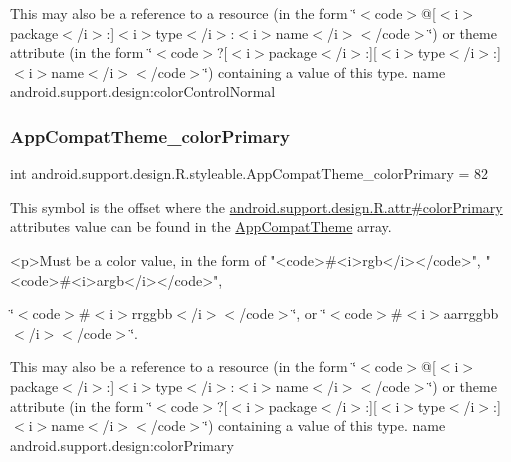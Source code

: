This may also be a reference to a resource (in the form \char`\"{}$<$code$>$@\mbox{[}$<$i$>$package$<$/i$>$\+:\mbox{]}$<$i$>$type$<$/i$>$\+:$<$i$>$name$<$/i$>$$<$/code$>$\char`\"{}) or theme attribute (in the form \char`\"{}$<$code$>$?\mbox{[}$<$i$>$package$<$/i$>$\+:\mbox{]}\mbox{[}$<$i$>$type$<$/i$>$\+:\mbox{]}$<$i$>$name$<$/i$>$$<$/code$>$\char`\"{}) containing a value of this type.  name android.\+support.\+design\+:color\+Control\+Normal \mbox{\label{classandroid_1_1support_1_1design_1_1R_1_1styleable_acffdce3af4b9cdfe390c502719236f7e}} 
\subsubsection{\texorpdfstring{App\+Compat\+Theme\+\_\+color\+Primary}{AppCompatTheme\_colorPrimary}}
{\footnotesize\ttfamily int android.\+support.\+design.\+R.\+styleable.\+App\+Compat\+Theme\+\_\+color\+Primary = 82\hspace{0.3cm}{\ttfamily [static]}}

This symbol is the offset where the \hyperlink{classandroid_1_1support_1_1design_1_1R_1_1attr_a541d0b27b3a34127103b8de1fcb27da8}{android.\+support.\+design.\+R.\+attr\#color\+Primary} attribute\textquotesingle{}s value can be found in the \hyperlink{classandroid_1_1support_1_1design_1_1R_1_1styleable_afb351dc8de20cbd4c89abe360373010c}{App\+Compat\+Theme} array.

\begin{DoxyVerb}      <p>Must be a color value, in the form of "<code>#<i>rgb</i></code>", "<code>#<i>argb</i></code>",
\end{DoxyVerb}
 \char`\"{}$<$code$>$\#$<$i$>$rrggbb$<$/i$>$$<$/code$>$\char`\"{}, or \char`\"{}$<$code$>$\#$<$i$>$aarrggbb$<$/i$>$$<$/code$>$\char`\"{}. 

This may also be a reference to a resource (in the form \char`\"{}$<$code$>$@\mbox{[}$<$i$>$package$<$/i$>$\+:\mbox{]}$<$i$>$type$<$/i$>$\+:$<$i$>$name$<$/i$>$$<$/code$>$\char`\"{}) or theme attribute (in the form \char`\"{}$<$code$>$?\mbox{[}$<$i$>$package$<$/i$>$\+:\mbox{]}\mbox{[}$<$i$>$type$<$/i$>$\+:\mbox{]}$<$i$>$name$<$/i$>$$<$/code$>$\char`\"{}) containing a value of this type.  name android.\+support.\+design\+:color\+Primary \mbox{\label{classandroid_1_1support_1_1design_1_1R_1_1styleable_a14ae278c8d0811cc9be02dcb6df531a3}} 
